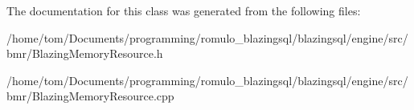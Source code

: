 The documentation for this class was generated from the following files\+:\begin{DoxyCompactItemize}
\item 
/home/tom/\+Documents/programming/romulo\+\_\+blazingsql/blazingsql/engine/src/bmr/Blazing\+Memory\+Resource.\+h\item 
/home/tom/\+Documents/programming/romulo\+\_\+blazingsql/blazingsql/engine/src/bmr/Blazing\+Memory\+Resource.\+cpp\end{DoxyCompactItemize}
